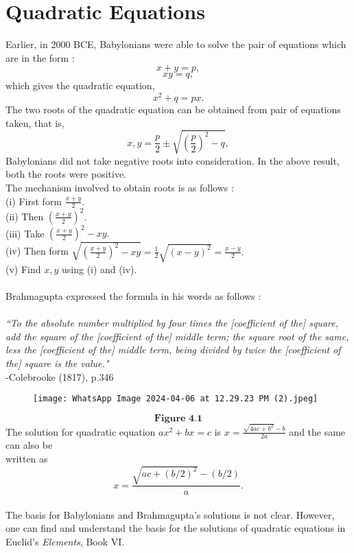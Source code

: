 \documentclass[a4paper,reqno,11pt]{book}
\theoremstyle{plain}%
\theoremstyle{definition}
\begin{document}
\section{Quadratic Equations}
Earlier, in 2000 BCE, Babylonians were able to solve the pair of equations which are in the form :\\
$$x + y = p,$$
$$xy = q,$$
which gives the quadratic equation,\\
$$x^2 + q = px.$$
The two roots of the quadratic equation can be obtained from pair of equations taken, that is,\\
$$x,y = \frac{p}{2} \pm \sqrt{\left(\frac{p}{2}\right)^2 - q},$$
Babylonians did not take negative roots into consideration. In the above result, both the roots were positive.\\
The mechanism involved to obtain roots is as follows :\\
(i) First form $\frac{x+y}{2}.$\\
(ii) Then $\left(\frac{x+y}{2}\right)^2.$\\
(iii) Take $\left(\frac{x+y}{2}\right)^2 - xy.$\\
(iv) Then form $\sqrt{\left(\frac{x+y}{2}\right)^2 - xy} = \frac{1}{2}\sqrt{(x-y)^2} = \frac{x-y}{2}.$\\
(v) Find $x, y$ using (i) and (iv).\\
\\
Brahmagupta expressed the formula in his words as follows :\\
\\
\indent \textit{``To the absolute number multiplied by four times the [coefficient of the] square, add the square of the [coefficient of the]
middle term; the square root of the same, less the [coefficient
of the] middle term, being divided by twice the [coefficient of
the] square is the value."}\cite{ref 1}\\
\vspace{2ex}
\hfill {-Colebrooke (1817), p.346}\\
\begin{figure}
\texttt{[image: WhatsApp Image 2024-04-06 at 12.29.23 PM (2).jpeg]}
\centering
\end{figure}
$$\textbf{Figure 4.1}$$
The solution for quadratic equation $ax^2 + bx = c$ is $x = \frac{\sqrt{4ac + b^2} - b}{2a}$ and the same can also be\\
written as\\
$$x = \frac{\sqrt{ac + (b/2)^2} - (b/2)}{a}.$$
\\
The basis for Babylonians and Brahmagupta's solutions is not clear. However, one can find and understand the basis for the solutions of quadratic equations in Euclid’s \textit{Elements}, Book VI.\\
\end{document}
